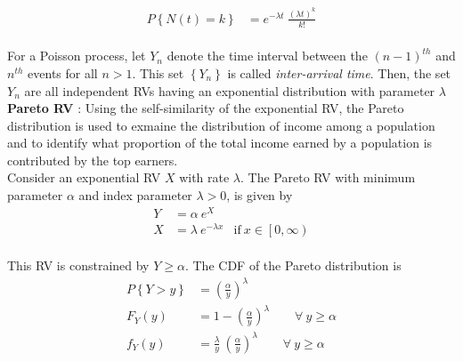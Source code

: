 \begin{align}
	P \left\{N(t) = k\right\} &= e^{-\lambda t} \ \frac{(\lambda t)^k}{k!}
\end{align} \\

For a Poisson process, let $ Y_n $ denote the time interval between the $ (n-1)^{th} $ and $ n^{th} $ events for all $ n > 1 $. This set $ \left\{Y_n\right\} $ is called \textit{inter-arrival time}. Then, the set $ Y_n $ are all independent RVs having an exponential distribution with parameter $ \lambda $ \\

\textbf{Pareto RV} : Using the self-similarity of the exponential RV, the Pareto distribution is used to exmaine the distribution of income among a population and to identify what proportion of the total income earned by a population is contributed by the top earners.\\

Consider an exponential RV $ X $ with rate $ \lambda $. The Pareto RV with minimum parameter $ \alpha $ and index parameter $ \lambda > 0$, is given by \\

\begin{align}
	Y &= \alpha\ e^{X} \\[1ex]
	X &= \lambda\ e^{-\lambda x} & \text{if}\ x \in \left[0, \infty\right) \nonumber
\end{align} \\

This RV is constrained by $ Y \geq \alpha $. The CDF of the Pareto distribution is \\

\begin{align}
	P \left\{Y > y\right\} &= \left(\frac{\alpha}{y}\right)^\lambda \nonumber \\[1ex]
	F_Y(y) &= 1 - \left(\frac{\alpha}{y}\right)^\lambda \qquad \forall \  y \geq \alpha \\[1ex]
	f_Y(y) &= \frac{\lambda}{y}\ \left(\frac{\alpha}{y}\right)^\lambda \qquad \forall \  y \geq \alpha
\end{align}\\

